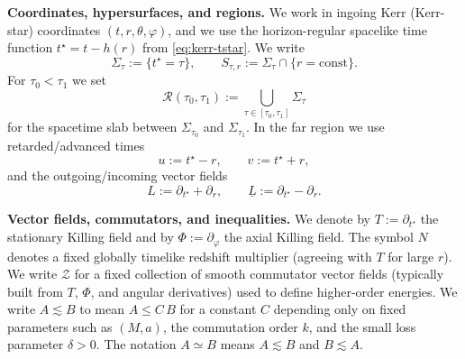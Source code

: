 \documentclass[11pt]{article}
\numberwithin{equation}{section}
\theoremstyle{plain}
\theoremstyle{definition}
\theoremstyle{remark}
\begin{document}
\medskip
\noindent\textbf{Coordinates, hypersurfaces, and regions.}
We work in ingoing Kerr (Kerr-star) coordinates $(t,r,\theta,\varphi)$, and we use the horizon-regular spacelike time function $t^{\star}=t-h(r)$ from \eqref{eq:kerr-tstar}.
We write
\begin{equation}
\Sigma_{\tau}:=\{t^{\star}=\tau\},\qquad S_{\tau,r}:=\Sigma_{\tau}\cap\{r=\mathrm{const}\}.
\end{equation}
For $\tau_{0}<\tau_{1}$ we set
\begin{equation}
\mathcal R(\tau_{0},\tau_{1}):=\bigcup_{\tau\in[\tau_{0},\tau_{1}]}\Sigma_{\tau}
\end{equation}
for the spacetime slab between $\Sigma_{\tau_{0}}$ and $\Sigma_{\tau_{1}}$.
In the far region we use retarded/advanced times
\begin{equation}
u:=t^{\star}-r,\qquad v:=t^{\star}+r,
\end{equation}
and the outgoing/incoming vector fields
\begin{equation}
L:=\partial_{t^{\star}}+\partial_{r},\qquad \underline L:=\partial_{t^{\star}}-\partial_{r}.
\end{equation}

\medskip
\noindent\textbf{Vector fields, commutators, and inequalities.}
We denote by $T:=\partial_{t^{\star}}$ the stationary Killing field and by $\Phi:=\partial_{\varphi}$ the axial Killing field.
The symbol $N$ denotes a fixed globally timelike redshift multiplier (agreeing with $T$ for large $r$).
We write $\mathcal Z$ for a fixed collection of smooth commutator vector fields (typically built from $T$, $\Phi$, and angular derivatives) used to define higher-order energies.
We write $A\lesssim B$ to mean $A\le C\,B$ for a constant $C$ depending only on fixed parameters such as $(M,a)$, the commutation order $k$, and the small loss parameter $\delta>0$.
The notation $A\simeq B$ means $A\lesssim B$ and $B\lesssim A$.
\end{document}
